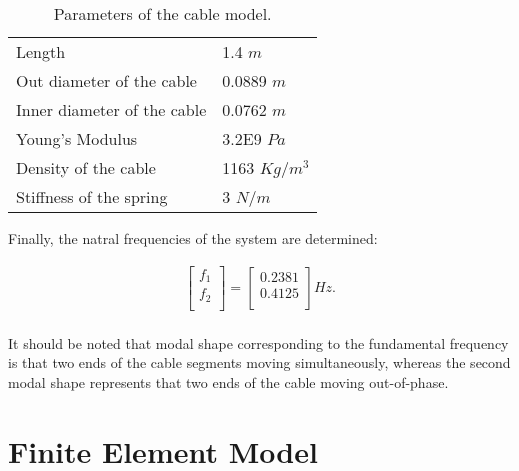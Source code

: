 \documentclass[paper=a4, fontsize=11pt]{scrartcl} %
\numberwithin{equation}{section} %
\numberwithin{figure}{section} %
\numberwithin{table}{section} %
\begin{document}
\begin{table}
  \centering
  \begin{tabular}{ll}
    \hline    
    Length	&   1.4 $m$ \\
    Out diameter of the cable &	0.0889 $m$ \\
    Inner diameter of the cable &	0.0762 $m$ \\
    Young's Modulus	& 3.2E9 $Pa$\\
    Density of the cable & 	 1163 $Kg/m^{3}$\\
    Stiffness of the spring	 &  3 $N/m$ \\
    \hline
  \end{tabular}
  \caption{Parameters of the cable model.}
  \label{tab:cable-parameter}
\end{table}

Finally, the natral frequencies of the system are determined:

\begin{align}
\left[\begin{matrix}f_1\\f_2\\\end{matrix}\right]=\left[\begin{matrix}0.2381\\0.4125\\\end{matrix}\right]
  Hz.\\
\end{align}







It should be noted that modal shape corresponding to the fundamental
frequency is that two ends of the cable segments moving
simultaneously, whereas the second modal shape represents that two
ends of the cable moving out-of-phase.

\section{Finite Element Model}
\label{sec:finite-element-model}
\end{document}
